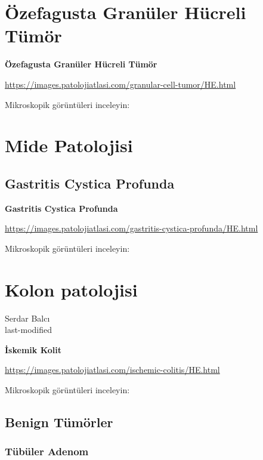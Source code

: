 \documentclass[
  letterpaper,
  DIV=11,
  numbers=noendperiod]{scrreprt}
\begin{document}
\hypertarget{uxf6zefagusta-granuxfcler-huxfccreli-tuxfcmuxf6r}{%
\chapter{Özefagusta Granüler Hücreli
Tümör}\label{uxf6zefagusta-granuxfcler-huxfccreli-tuxfcmuxf6r}}

\textbf{Özefagusta Granüler Hücreli Tümör}

\url{https://images.patolojiatlasi.com/granular-cell-tumor/HE.html}

Mikroskopik görüntüleri inceleyin:

\hypertarget{mide-patolojisi}{%
\chapter{Mide Patolojisi}\label{mide-patolojisi}}

\hypertarget{gastritis-cystica-profunda}{%
\section{Gastritis Cystica Profunda}\label{gastritis-cystica-profunda}}

\textbf{Gastritis Cystica Profunda}

\url{https://images.patolojiatlasi.com/gastritis-cystica-profunda/HE.html}

Mikroskopik görüntüleri inceleyin:

\hypertarget{kolon-patolojisi}{%
\chapter{Kolon patolojisi}\label{kolon-patolojisi}}

Serdar Balcı\\
last-modified

\hfill\break

\textbf{İskemik Kolit}

\url{https://images.patolojiatlasi.com/ischemic-colitis/HE.html}

Mikroskopik görüntüleri inceleyin:

\hypertarget{benign-tuxfcmuxf6rler-1}{%
\section{Benign Tümörler}\label{benign-tuxfcmuxf6rler-1}}

\hypertarget{tuxfcbuxfcler-adenom-1}{%
\subsection{Tübüler Adenom}\label{tuxfcbuxfcler-adenom-1}}
\end{document}
